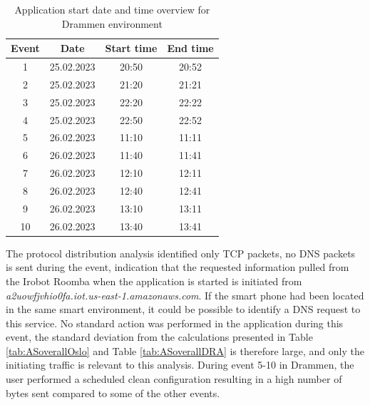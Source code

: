\begin{table}[H]
\centering
\caption{Application start date and time overview for Drammen environment}
\label{tab:AS_dateandtimeDrammen}
\begin{tabular}{|c|c|c|c|}
\hline
\textbf{Event} & \textbf{Date} & \textbf{Start time} & \textbf{End time} \\ \hline
1              & 25.02.2023         & 20:50               & 20:52             \\ \hline
2              & 25.02.2023         & 21:20               & 21:21             \\ \hline
3              & 25.02.2023         & 22:20               & 22:22             \\ \hline
4              & 25.02.2023         & 22:50               & 22:52             \\ \hline
5              & 26.02.2023         & 11:10               & 11:11             \\ \hline
6              & 26.02.2023         & 11:40               & 11:41             \\ \hline
7              & 26.02.2023         & 12:10               & 12:11             \\ \hline
8              & 26.02.2023         & 12:40               & 12:41             \\ \hline
9              & 26.02.2023         & 13:10               & 13:11             \\ \hline
10             & 26.02.2023         & 13:40               & 13:41             \\ \hline
\end{tabular}
\end{table}

The protocol distribution analysis identified only TCP packets, no DNS packets is sent during the event, indication that the requested information pulled from the Irobot Roomba when the application is started is initiated from \textit{a2uowfjvhio0fa.iot.us-east-1.amazonaws.com}. If the smart phone had been located in the same smart environment, it could be possible to identify a DNS request to this service. No standard action was performed in the application during this event, the standard deviation from the calculations presented in Table \ref{tab:ASoverallOslo} and Table \ref{tab:ASoverallDRA} is therefore large, and only the initiating traffic is relevant to this analysis. During event 5-10 in Drammen, the user performed a scheduled clean configuration resulting in a high number of bytes sent compared to some of the other events.  

